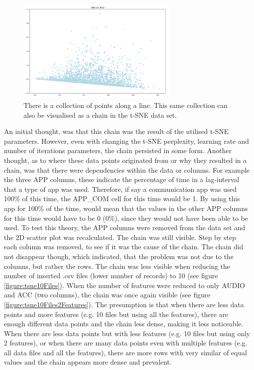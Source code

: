 \begin{figure}[h]
  \centering
  \includegraphics[width=0.7\textwidth]{./images/pcaChain.png}
  \caption{There is a collection of points along a line. This same collection can also be visualised as a chain in the t-SNE data set.}
  \label{figure:pcaChain}
\end{figure}

An initial thought, was that this chain was the result of the utilised t-SNE parameters. However, even with changing the t-SNE perplexity, learning rate and number of iterations parameters, the chain persisted in some form. Another thought, as to where these data points originated from or why they resulted in a chain, was that there were dependencies within the data or columns. For example the three APP columns, these indicate the percentage of time in a lag-interval that a type of app was used. Therefore, if say a communication app was used 100\% of this time, the APP\_COM cell for this time would be 1. By using this app for 100\% of the time, would mean that the values in the other APP columns for this time would have to be 0 (0\%), since they would not have been able to be used. To test this theory, the APP columns were removed from the data set and the 2D scatter plot was recalculated. The chain was still visible. Step by step each column was removed, to see if it was the cause of the chain. The chain did not disappear though, which indicated, that the problem was not due to the columns, but rather the rows. The chain was less visible when reducing the number of inserted .csv files (lower number of records) to 10 (see figure \ref{figure:tsne10Files}). When the number of features were reduced to only AUDIO and ACC (two columns), the chain was once again visible (see figure \ref{figure:tsne10Files2Features}). The presumption is that when there are less data points and more features (e.g. 10 files but using all the features), there are enough different data points and the chain less dense, making it less noticeable. When there are less data points but with less features (e.g. 10 files but using only 2 features), or when there are many data points even with multiple features (e.g. all data files and all the features), there are more rows with very similar of equal values and the chain appears more dense and prevalent.

